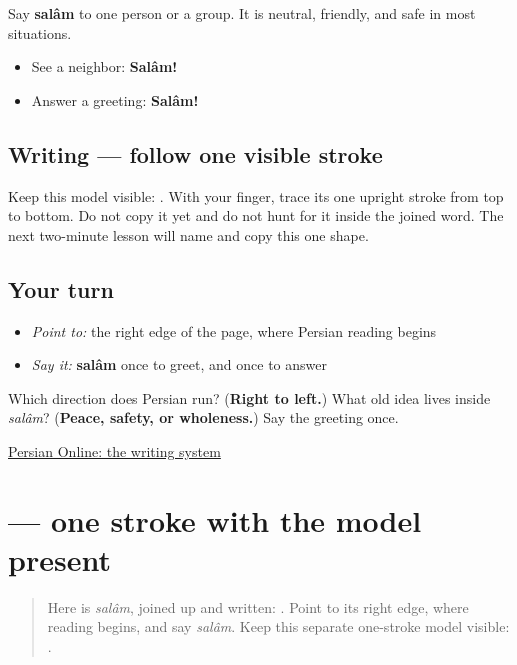 \begin{culture}
Say \textbf{salâm} to one person or a group. It is neutral, friendly, and safe in most situations.

\begin{itemize}
\raggedright
  \item See a neighbor: \textbf{Salâm!}
  \item Answer a greeting: \textbf{Salâm!}
\end{itemize}
\end{culture}

\subsection*{Writing — follow one visible stroke}
Keep this model visible: \textbf{}. With your finger, trace its one upright stroke from top to bottom. Do not copy it yet and do not hunt for it inside the joined word. The next two-minute lesson will name and copy this one shape.

\subsection*{Your turn}
\begin{itemize}
\raggedright
  \item \emph{Point to:} the right edge of the page, where Persian reading begins
  \item \emph{Say it:} \textbf{salâm} once to greet, and once to answer
\end{itemize}

\begin{tcolorbox}[breakable,colback=teal!4,colframe=teal!35!black,title={Before you move on}]
Which direction does Persian run? (\textbf{Right to left.}) What old idea lives inside \emph{salâm}? (\textbf{Peace, safety, or wholeness.}) Say the greeting once.

\href{https://sites.la.utexas.edu/persian\_online\_resources/the-writing-system/}{Persian Online: the writing system}
\end{tcolorbox}
\section[\texorpdfstring{\fa{ا} (alef)}{ا (alef)}]{ — one stroke with the model present}

\label{lesson:FA-W00-alef-guided-copy}



\begin{quote}
Here is \emph{salâm}, joined up and written: \textbf{}. Point to its right edge, where reading begins, and say \emph{salâm}. Keep this separate one-stroke model visible: \textbf{}.
\end{quote}

